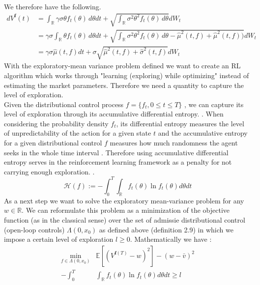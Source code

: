 \documentclass[oneside, a4paper, onecolumn, 11pt]{article}
\begin{document}
We therefore have the following.  
\begin{align}
dV^{\boldsymbol{f}}(t) &= \int_{\mathbb{R}} \gamma \sigma \theta f_t(\theta) \, d\theta dt + \sqrt{\int_{\mathbb{R}} \sigma^2 \theta^2 f_t(\theta) \, d\theta}dW_t \\
&= \gamma \sigma \int_{\mathbb{R}}  \theta f_t(\theta) \, d\theta dt +  \sqrt{\int_{\mathbb{R}} \sigma^2 \theta^2 f_t(\theta) \, d\theta - \hat{\mu}^2(t,f) + \hat{\mu}^2(t,f))} dW_t \\
& = \gamma \sigma \hat{\mu}(t,f) dt + \sigma\sqrt{\hat{\mu}^2(t,f) + \hat{\sigma}^2(t,f)} dW_t \label{changed_SDE:eq}
\end{align} 
With the exploratory-mean variance problem defined we want to create an RL algorithm which works through "learning (exploring) while optimizing" instead of estimating the market parameters. Therefore we need a quantity to capture the level of exploration. \\Given the distributional control process  \(f = \{f_t, 0 \leq t \leq T\} \) , we can capture its level of exploration through its accumulative differential entropy. \cite{Haarnoja2018}. When considering the probability density $f_t$, its differential entropy measures the level of unpredictability of the action for a given state $t$ and the accumulative entropy for a given distributional control $f$ measures how much randomness the agent seeks in the whole time interval \cite{Shannon1948}. Therefore using accumulative differential entropy serves in the reinforcement learning framework as a penalty for not carrying enough exploration. \cite{WangZhou2020}.
\begin{equation}
    \mathcal{H}(f) := - \int_{0}^{T} \int_{\mathbb{R}} f_t(\theta)\ln{f_t}(\theta)d\theta dt
\end{equation}
As a next step we want to solve the exploratory mean-variance problem for any $w \in \mathbb{R}$. We can reformulate this problem as a minimization of the objective function (as in the classical sense) over the set of admissie distributional control (open-loop controls) $\Lambda(0,x_0)$ as defined above (definition 2.9) in which we impose a certain level of exploration $l \geq 0$. Mathematically we have : 
\begin{align*}
\min_{f\in\Lambda(0,x_0)} &\mathbb{E}\left[\left(V^{\boldsymbol{f}(T)}-w\right)^2\right] - (w-\bar{v})^2\\ 
- \int_{0}^{T} &\int_{\mathbb{R}} f_t(\theta)\ln{f_t}(\theta)d\theta dt \geq l 
\end{align*}
\end{document}
